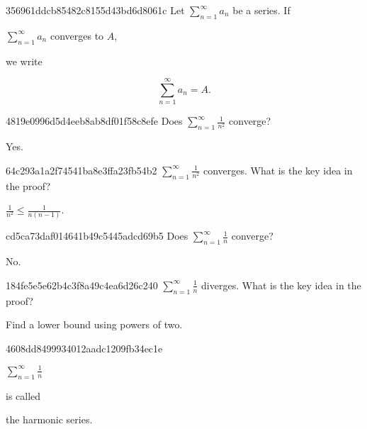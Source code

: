 \begin{note}{356961ddcb85482c8155d43bd6d8061c}
    Let \({ \sum_{n=1}^{\infty} a_n }\) be a series.
    If \begin{icloze}{2}\({ \sum_{n=1}^{\infty} a_n }\) converges to \({ A }\),\end{icloze} we write
    \begin{icloze}{1}
        \[
            \sum_{n=1}^{\infty} a_n = A.
        \]
    \end{icloze}
\end{note}

\begin{note}{4819e0996d5d4eeb8ab8df01f58c8efe}
    Does \({ \sum_{n=1}^{\infty} \frac{1}{n^2} }\) converge?

    \begin{cloze}{1}
        Yes.
    \end{cloze}
\end{note}

\begin{note}{64c293a1a2f74541ba8e3ffa23fb54b2}
    \({ \sum_{n=1}^{\infty} \frac{1}{n^2} }\) converges.
    What is the key idea in the proof?

    \begin{cloze}{1}
        \({ \frac{1}{n^2} \leq \frac{1}{n(n - 1)} }\).
    \end{cloze}
\end{note}

\begin{note}{cd5ca73daf014641b49c5445adcd69b5}
    Does \({ \sum_{n=1}^{\infty} \frac{1}{n} }\) converge?

    \begin{cloze}{1}
        No.
    \end{cloze}
\end{note}

\begin{note}{184fe5e5e62b4c3f8a49c4ea6d26c240}
    \({ \sum_{n=1}^{\infty} \frac{1}{n} }\) diverges.
    What is the key idea in the proof?

    \begin{cloze}{1}
        Find a lower bound using powers of two.
    \end{cloze}
\end{note}

\begin{note}{4608dd8499934012aadc1209fb34ec1e}
    \begin{icloze}{2}\({ \sum_{n=1}^{\infty} \frac{1}{n} }\)\end{icloze} is called \begin{icloze}{1}the harmonic series.\end{icloze}
\end{note}

